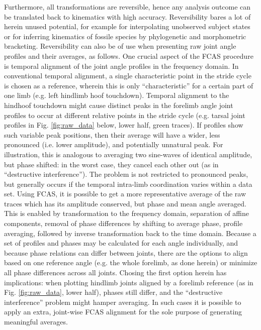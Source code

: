 \documentclass[10pt,a4paper]{article}
\begin{document}
Furthermore, all transformations are reversible, hence any analysis outcome can be translated back to kinematics with high accuracy.
Reversibility bares a lot of herein unused potential, for example for interpolating unobserved subject states or for inferring kinematics of fossile species by phylogenetic and morphometric bracketing.
Reversibility can also be of use when presenting raw joint angle profiles and their averages, as follows.
One crucial aspect of the FCAS procedure is temporal alignment of the joint angle profiles in the frequency domain.
In conventional temporal alignment, a single characteristic point in the stride cycle is chosen as a reference, wherein this is only ``characteristic'' for a certain part of one limb (e.g. left hindlimb hoof touchdown).
Temporal alignment to the hindhoof touchdown might cause distinct peaks in the forelimb angle joint profiles to occur at different relative points in the stride cycle (e.g. tarsal joint profiles in Fig. \ref{fig:raw_data} below, lower half, green traces).
If profiles show such variable peak positions, then their average will have a wider, less pronounced (i.e. lower amplitude), and potentially unnatural peak.
For illustration, this is analogous to averaging two sine-waves of identical amplitude, but phase shifted: in the worst case, they cancel each other out (as in ``destructive interference'').
The problem is not restricted to pronounced peaks, but generally occurs if the temporal intra-limb coordination varies within a data set.
Using FCAS, it is possible to get a more representative average of the raw traces which has its amplitude conserved, but phase and mean angle averaged.
This is enabled by transformation to the frequency domain, separation of affine components, removal of phase differences by shifting to average phase, profile averaging, followed by inverse transformation back to the time domain.
Because a set of profiles and phases may be calculated for each angle individually, and because phase relations can differ between joints, there are the options to align based on one reference angle (e.g. the whole forelimb, as done herein) or minimize all phase differences across all joints.
Chosing the first option herein has implications: when plotting hindlimb joints aligned by a forelimb reference (as in Fig. \ref{fig:raw_data}, lower half), phases still differ, and the ``destructive interference'' problem might hamper averaging.
In such cases it is possible to apply an extra, joint-wise FCAS alignment for the sole purpose of generating meaningful averages.
\end{document}
